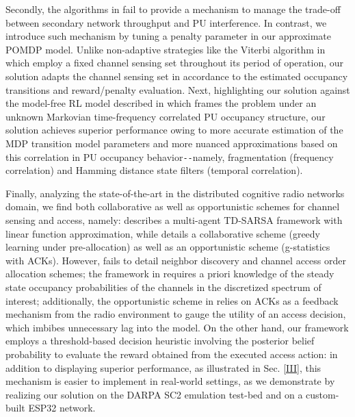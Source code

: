 \documentclass[10pt, twocolumn]{IEEEtran}
\begin{document}
Secondly, the algorithms in \cite{WCL:4, WCL:5, WCL:6, WCL:7, WCL:9, WCL:10, WCL:8, WCL:3, WCL:11, WCL:MIT, WCL:DQN} fail to provide a mechanism to manage the trade-off between secondary network throughput and PU interference.
In contrast, we introduce such mechanism by tuning a penalty parameter in our approximate POMDP model. 
 Unlike non-adaptive strategies like the Viterbi algorithm in \cite{WCL:6} which employ a fixed channel sensing set throughout its period of operation, our solution adapts the channel sensing set in accordance to the estimated occupancy transitions and reward/penalty evaluation. Next, highlighting our solution against the model-free RL model described in \cite{WCL:DQN} which frames the problem under an unknown Markovian time-frequency correlated PU occupancy structure, our solution achieves superior performance owing to more accurate estimation of the MDP transition model parameters and more nuanced approximations based on this correlation in PU occupancy behavior\texttt{-{}-}namely, fragmentation (frequency correlation) and Hamming distance state filters (temporal correlation).

Finally, analyzing the state-of-the-art in the distributed cognitive radio networks domain, we find both collaborative as well as opportunistic schemes for channel sensing and access, namely: \cite{WCL:5} describes a multi-agent TD-SARSA framework with linear function approximation, while \cite{WCL:MIT} details a collaborative scheme (greedy learning under pre-allocation) as well as an opportunistic scheme (g-statistics with ACKs). However, \cite{WCL:5} fails to detail neighbor discovery and channel access order allocation schemes;  the framework in \cite{WCL:MIT} requires a priori knowledge of the steady state occupancy probabilities of the channels in the discretized spectrum of interest; additionally, the opportunistic scheme in \cite{WCL:MIT} relies on ACKs as a feedback mechanism from the radio environment to gauge the utility of an access decision, which imbibes unnecessary lag into the model. On the other hand, our framework employs a threshold-based decision heuristic involving the posterior belief probability to evaluate the reward obtained from the executed access action: in addition to displaying superior performance, as illustrated in Sec. \ref{III}, this mechanism is easier to implement in real-world settings, as we demonstrate by realizing our solution on the DARPA SC2 emulation test-bed and on a custom-built ESP32 network.
\end{document}

